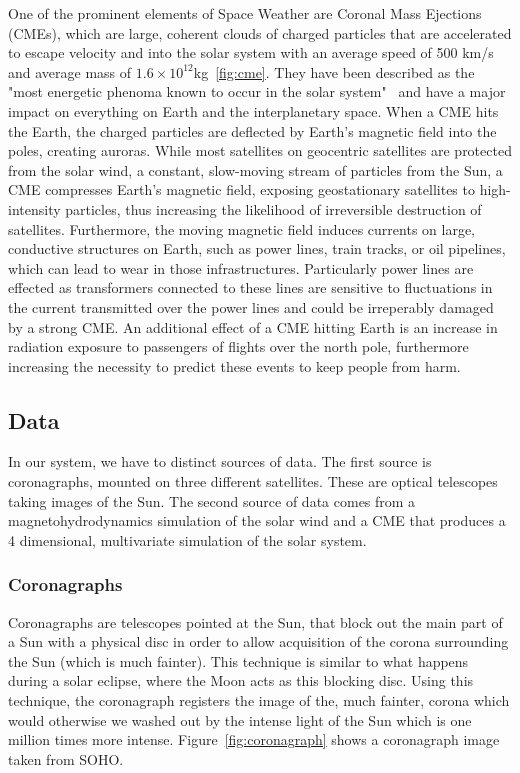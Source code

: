 \documentclass[journal]{vgtc}                %
\begin{document}
One of the prominent elements of Space Weather are Coronal Mass Ejections (CMEs), which are large, coherent clouds of charged particles that are accelerated to escape velocity and into the solar system with an average speed of 500 km/s and average mass of $1.6 \times 10^12$kg~\ref{fig:cme}. They have been described as the "most energetic phenoma known to occur in the solar system"~\cite{Kahler:1987jt} and have a major impact on everything on Earth and the interplanetary space. When a CME hits the Earth, the charged particles are deflected by Earth's magnetic field into the poles, creating auroras. While most satellites on geocentric satellites are protected from the solar wind, a constant, slow-moving stream of particles from the Sun, a CME compresses Earth's magnetic field, exposing geostationary satellites to high-intensity particles, thus increasing the likelihood of irreversible destruction of satellites. Furthermore, the moving magnetic field induces currents on large, conductive structures on Earth, such as power lines, train tracks, or oil pipelines, which can lead to wear in those infrastructures. Particularly power lines are effected as transformers connected to these lines are sensitive to fluctuations in the current transmitted over the power lines and could be irreperably damaged by a strong CME. An additional effect of a CME hitting Earth is an increase in radiation exposure to passengers of flights over the north pole, furthermore increasing the necessity to predict these events to keep people from harm.

\subsection{Data} \label{sec:data}
In our system, we have to distinct sources of data. The first source is coronagraphs, mounted on three different satellites. These are optical telescopes taking images of the Sun. The second source of data comes from a magnetohydrodynamics simulation of the solar wind and a CME that produces a 4 dimensional, multivariate simulation of the solar system.

\subsubsection{Coronagraphs} \label{sec:coronagraph}
Coronagraphs are telescopes pointed at the Sun, that block out the main part of a Sun with a physical disc in order to allow acquisition of the corona surrounding the Sun (which is much fainter). This technique is similar to what happens during a solar eclipse, where the Moon acts as this blocking disc. Using this technique, the coronagraph registers the image of the, much fainter, corona which would otherwise we washed out by the intense light of the Sun which is one million times more intense. Figure~\ref{fig:coronagraph} shows a coronagraph image taken from SOHO.
\end{document}
